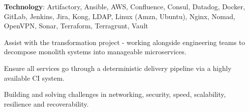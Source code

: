 \sectionsep
\textbf{Technology}: Artifactory, Ansible, AWS, Confluence, Consul, Datadog, Docker, GitLab, Jenkins, Jira, Kong, LDAP, Linux (Amzn, Ubuntu), Nginx, Nomad, OpenVPN, Sonar, Terraform, Terragrunt, Vault
\sectionsep
\begin{tightemize}
\item Assist with the transformation project - working alongside engineering teams to decompose monolith systems into manageable microservices.
\item Ensure all services go through a deterministic delivery pipeline via a highly available CI system.
\item Building and solving challenges in networking, security, speed, scalability, resilience and recoverability.
\end{tightemize}
\sectionsep

